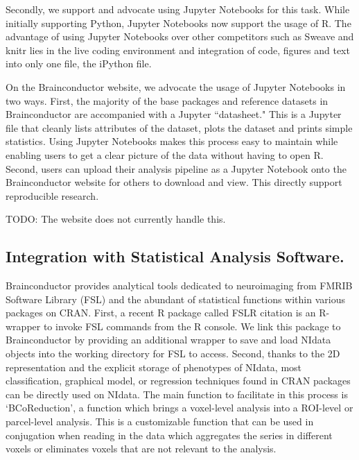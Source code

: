 \documentclass{nature}
\begin{document}
Secondly, we support and advocate using Jupyter Notebooks for
this task. While initially supporting Python, Jupyter Notebooks now support
the usage of R. The advantage of using Jupyter Notebooks over other competitors
such as Sweave and knitr lies in the live coding environment and
integration of code, figures and text into only one file, the iPython file.

On the Brainconductor website, we advocate the usage of Jupyter Notebooks
in two ways. First, the majority of the base packages and reference datasets
in Brainconductor are accompanied with a Jupyter ``datasheet." This is a
Jupyter file that cleanly lists attributes of the dataset, plots the dataset
and prints simple statistics. Using Jupyter Notebooks makes this process easy
to maintain while enabling users to get a clear picture of the data without
having to open R. Second, users can upload their analysis pipeline as a Jupyter
Notebook onto the Brainconductor website for others to download and view. This
directly support reproducible research.

{\color{red}TODO: The website does not currently handle this.}


\subsection{Integration with Statistical Analysis Software.}

Brainconductor provides analytical tools dedicated to neuroimaging from
FMRIB Software Library (FSL) and the abundant of statistical functions within
various packages on CRAN. 
First, a recent R package called FSLR {\color{red}citation} is an R-wrapper to invoke
FSL commands from the R console. We link this package to Brainconductor by providing
an additional wrapper to save and load NIdata objects into the working directory for
FSL to access.
Second, thanks to the 2D representation and the explicit storage of
phenotypes of NIdata, most classification, graphical model, or regression
techniques
found in CRAN packages can be directly used on NIdata. The main function to
facilitate in this process is `BCoReduction', a function which brings a
voxel-level
analysis into a ROI-level or parcel-level analysis. This is a customizable
function
that can be used in conjugation when reading in the data which aggregates
the series
in different voxels or eliminates voxels that are not relevant to the analysis.
\end{document}
